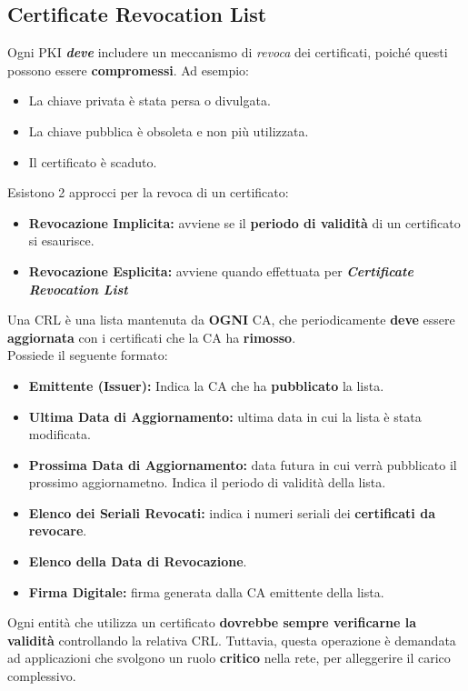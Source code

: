 \subsection{Certificate Revocation List}
Ogni PKI \textit{\textbf{deve}} includere un meccanismo di \textit{revoca} dei certificati, poiché questi possono essere \textbf{compromessi}. Ad esempio: 
\begin{itemize}
    \item La chiave privata è stata persa o divulgata.
    \item La chiave pubblica è obsoleta e non più utilizzata.
    \item Il certificato è scaduto.
\end{itemize}
Esistono 2 approcci per la revoca di un certificato:
\begin{itemize}
    \item \textbf{Revocazione Implicita:} avviene se il \textbf{periodo di validità} di un certificato si esaurisce.
    \item \textbf{Revocazione Esplicita:} avviene quando effettuata per \textbf{\textit{Certificate Revocation List}}
\end{itemize}
\begin{definition}
Una CRL è una lista mantenuta da \textbf{OGNI} CA, che periodicamente \textbf{deve} essere \textbf{aggiornata} con i certificati che la CA ha \textbf{rimosso}.\\
Possiede il seguente formato:
\begin{itemize}
    \item \textbf{Emittente (Issuer):} Indica la CA che ha \textbf{pubblicato} la lista.
    \item \textbf{Ultima Data di Aggiornamento:} ultima data in cui la lista è stata modificata.
    \item \textbf{Prossima Data di Aggiornamento:} data futura in cui verrà pubblicato il prossimo aggiornametno. Indica il periodo di validità della lista.
    \item \textbf{Elenco dei Seriali Revocati:} indica i numeri seriali dei \textbf{certificati da revocare}.
    \item \textbf{Elenco della Data di Revocazione}.
    \item \textbf{Firma Digitale:} firma generata dalla CA emittente della lista.
\end{itemize}
\end{definition}
\begin{note}
Ogni entità che utilizza un certificato \textbf{dovrebbe sempre verificarne la validità} controllando la relativa CRL. Tuttavia, questa operazione è demandata ad applicazioni che svolgono un ruolo \textbf{critico} nella rete, per alleggerire il carico complessivo.
\end{note}
